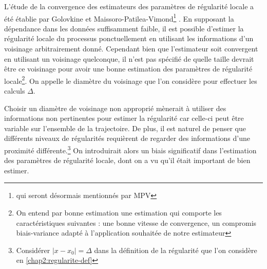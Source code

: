 
L'étude de la convergence des estimateurs des paramètres de régularité locale a été établie par Golovkine et Maissoro-Patilea-Vimond\footnote{qui seront désormais mentionnés par \og MPV \fg} \cite{golovkineRegularityOnlineEstimationNoisyCurve,maissoro-SmoothnessFTSweakDep}. En supposant la dépendance dans les données suffisamment faible, il est possible d'estimer la régularité locale du processus ponctuellement en utilisant les informations d'un voisinage arbitrairement donné. Cependant bien que l'estimateur soit convergent en utilisant un voisinage quelconque, il n'est pas spécifié de quelle taille devrait être ce voisinage pour avoir une bonne estimation des paramètres de régularité locale\footnote{On entend par bonne estimation une estimation qui comporte les caractéristiques suivantes : une bonne vitesse de convergence, un compromis biais-variance adapté à l'application souhaitée de notre estimateur}. On appelle le diamètre du voisinage que l'on considère pour effectuer les calculs $\Delta$.


Choisir un diamètre de voisinage non approprié mènerait à utiliser des informations non pertinentes pour estimer la régularité car celle-ci peut être variable sur l'ensemble de la trajectoire. De plus, il est naturel de penser que différents niveaux de régularités requièrent de regarder des informations d'une proximité différente.\footnote{Considérer $|x-x_0| = \Delta$ dans la définition de la régularité que l'on considère en \ref{chap2:regularite-def} } On introduirait alors un biais significatif dans l'estimation des paramètres de régularité locale, dont on a vu qu'il était important de bien estimer.
